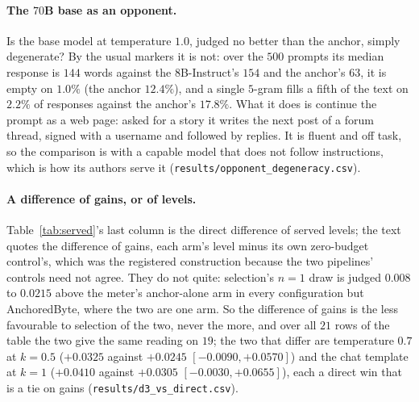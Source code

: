 \paragraph{The $70$B base as an opponent.} Is the base model at temperature $1.0$, judged no better than the
anchor, simply degenerate? By the usual markers it is not: over the $500$ prompts its median response is
$144$ words against the $8$B-Instruct's $154$ and the anchor's $63$, it is empty on $1.0\%$ (the anchor
$12.4\%$), and a single $5$-gram fills a fifth of the text on $2.2\%$ of responses against the anchor's
$17.8\%$. What it does is continue the prompt as a web page: asked for a story it writes the next post of a
forum thread, signed with a username and followed by replies. It is fluent and off task, so
the comparison is with a capable model that does not follow instructions, which is how its authors serve it
(\texttt{results/\allowbreak opponent\_\allowbreak degeneracy.csv}).

\paragraph{A difference of gains, or of levels.} Table~\ref{tab:served}'s last column is the direct
difference of served levels; the text quotes the difference of gains, each arm's level minus its own
zero-budget control's, which was the registered construction because the two pipelines' controls need not
agree. They do not quite: selection's $n=1$ draw is judged $0.008$ to $0.0215$ above the meter's anchor-alone
arm in every configuration but AnchoredByte, where the two are one arm. So the difference of gains is the
less favourable to selection of the two, never the more, and over all $21$ rows of the table the two give the
same reading on $19$; the two that differ are temperature $0.7$ at $k=0.5$ ($+0.0325$ against $+0.0245$
$[-0.0090, +0.0570]$) and the chat template at $k=1$ ($+0.0410$ against $+0.0305$ $[-0.0030, +0.0655]$),
each a direct win that is a tie on gains (\texttt{results/\allowbreak d3\_\allowbreak vs\_\allowbreak direct.csv}).

